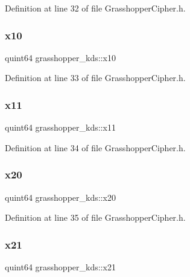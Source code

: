 Definition at line 32 of file Grasshopper\+Cipher.\+h.

\mbox{\label{structgrasshopper__kds_a33907d8b365db74655dbab0a430d938d}} 
\subsubsection{\texorpdfstring{x10}{x10}}
{\footnotesize\ttfamily quint64 grasshopper\+\_\+kds\+::x10}



Definition at line 33 of file Grasshopper\+Cipher.\+h.

\mbox{\label{structgrasshopper__kds_a6d4a32cdb266eb7513e0403d75a7fa40}} 
\subsubsection{\texorpdfstring{x11}{x11}}
{\footnotesize\ttfamily quint64 grasshopper\+\_\+kds\+::x11}



Definition at line 34 of file Grasshopper\+Cipher.\+h.

\mbox{\label{structgrasshopper__kds_a4e196e0477afe815cf4b655618c478a9}} 
\subsubsection{\texorpdfstring{x20}{x20}}
{\footnotesize\ttfamily quint64 grasshopper\+\_\+kds\+::x20}



Definition at line 35 of file Grasshopper\+Cipher.\+h.

\mbox{\label{structgrasshopper__kds_ade07e3145de67c1f8bb65271486391a1}} 
\subsubsection{\texorpdfstring{x21}{x21}}
{\footnotesize\ttfamily quint64 grasshopper\+\_\+kds\+::x21}



